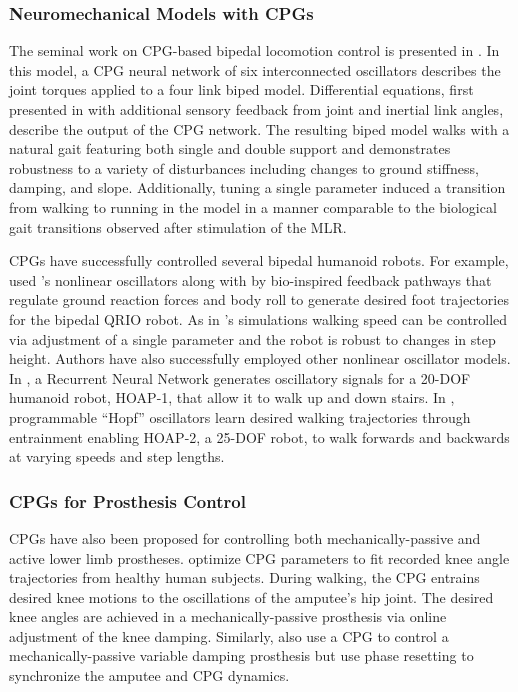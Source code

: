 \subsubsection{Neuromechanical Models with CPGs}
The seminal work on CPG-based bipedal locomotion control is presented in
\citet{taga1991self}. In this model, a CPG neural network of six interconnected
oscillators describes the joint torques applied to a four link biped model.
Differential equations, first presented in \citet{matsuoka1987mechanisms} with
additional sensory feedback from joint and inertial link angles, describe the
output of the CPG network. The resulting biped model walks with a natural gait
featuring both single and double support and demonstrates robustness to a
variety of disturbances including changes to ground stiffness, damping, and
slope. Additionally, tuning a single parameter induced a transition from walking
to running in the model in a manner comparable to the biological gait
transitions observed after stimulation of the MLR.

CPGs have successfully controlled several bipedal humanoid robots. For example,
\citet{endo2005experimental} used \citeauthor{matsuoka1987mechanisms}'s
nonlinear oscillators along with by bio-inspired feedback pathways that regulate
ground reaction forces and body roll to generate desired foot trajectories for
the bipedal QRIO robot. As in \citeauthor{taga1991self}'s simulations walking
speed can be controlled via adjustment of a single parameter and the robot is
robust to changes in step height. Authors have also successfully employed other
nonlinear oscillator models. In \citet{shan2002neural}, a Recurrent Neural
Network generates oscillatory signals for a 20-DOF humanoid robot, HOAP-1, that
allow it to walk up and down stairs. In \citet{righetti2006programmable},
programmable ``Hopf'' oscillators \citep{righetti2006dynamic} learn desired
walking trajectories through entrainment enabling HOAP-2, a 25-DOF robot, to
walk forwards and backwards at varying speeds and step lengths.  

\subsubsection{CPGs for Prosthesis Control}
CPGs have also been proposed for controlling both mechanically-passive and
active lower limb prostheses.  \citet{nandi2009development} optimize CPG
parameters to fit recorded knee angle trajectories from healthy human subjects.
During walking, the CPG entrains desired knee motions to the oscillations of the
amputee's hip joint. The desired knee angles are achieved in a
mechanically-passive prosthesis via online adjustment of the knee damping.
Similarly, \citet{torrealba2010through, mora2012cybernetic} also use a CPG to
control a mechanically-passive variable damping prosthesis but use phase
resetting to synchronize the amputee and CPG dynamics. 

